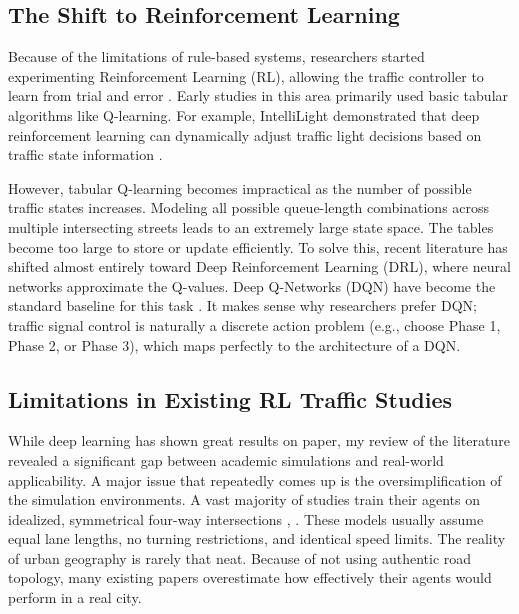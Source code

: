 \documentclass[conference]{IEEEtran}
\begin{document}
\subsection{The Shift to Reinforcement Learning}
Because of the limitations of rule-based systems, researchers started experimenting Reinforcement Learning (RL), allowing the traffic controller to learn from trial and error \cite{b11}. Early studies in this area primarily used basic tabular algorithms like Q-learning. For example, IntelliLight demonstrated that deep reinforcement learning can dynamically adjust traffic light decisions based on traffic state information \cite{b3}.

However, tabular Q-learning becomes impractical as the number of possible traffic states increases. Modeling all possible queue-length combinations across multiple intersecting streets leads to an extremely large state space. The tables become too large to store or update efficiently. To solve this, recent literature has shifted almost entirely toward Deep Reinforcement Learning (DRL), where neural networks approximate the Q-values. Deep Q-Networks (DQN) have become the standard baseline for this task \cite{b4}. It makes sense why researchers prefer DQN; traffic signal control is naturally a discrete action problem (e.g., choose Phase 1, Phase 2, or Phase 3), which maps perfectly to the architecture of a DQN.

\subsection{Limitations in Existing RL Traffic Studies}
While deep learning has shown great results on paper, my review of the literature revealed a significant gap between academic simulations and real-world applicability. A major issue that repeatedly comes up is the oversimplification of the simulation environments. A vast majority of studies train their agents on idealized, symmetrical four-way intersections \cite{b5}, \cite{b6}. These models usually assume equal lane lengths, no turning restrictions, and identical speed limits. The reality of urban geography is rarely that neat. Because of not using authentic road topology, many existing papers overestimate how effectively their agents would perform in a real city.
\end{document}
